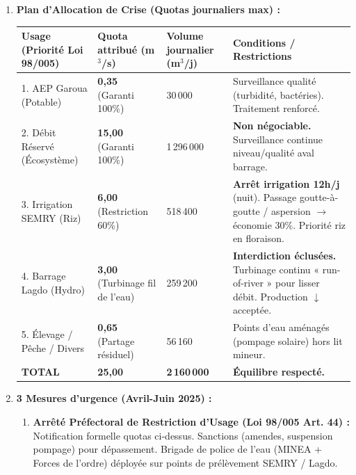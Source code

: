 \documentclass[11pt]{article}
\begin{document}
\begin{exoresolu}
\begin{enumerate}
\begin{itemize}
            \item Élevage / Pêche / Autre : Estimé $< 2$ m$^3$/s (diffus).
        \end{itemize}
        \item \textbf{Plan d'Allocation de Crise (Quotas journaliers max) :}
        \begin{center}
            \begin{tabularx}{\linewidth}{|l|l|l|X|}\hline
            \rowcolor{popblueL}
            \textbf{Usage (Priorité Loi 98/005)} & \textbf{Quota attribué (m$^3$/s)} & \textbf{Volume journalier (m$^3$/j)} & \textbf{Conditions / Restrictions} \\ \hline
            1. AEP Garoua (Potable) & \textbf{0,35} (Garanti 100\%) & 30\,000 & Surveillance qualité (turbidité, bactéries). Traitement renforcé. \\ \hline
            2. Débit Réservé (Écosystème) & \textbf{15,00} (Garanti 100\%) & 1\,296\,000 & \textbf{Non négociable.} Surveillance continue niveau/qualité aval barrage. \\ \hline
            3. Irrigation SEMRY (Riz) & \textbf{6,00} (Restriction 60\%) & 518\,400 & \textbf{Arrêt irrigation 12h/j} (nuit). Passage goutte-à-goutte / aspersion $\rightarrow$ économie 30\%. Priorité riz en floraison. \\ \hline
            4. Barrage Lagdo (Hydro) & \textbf{3,00} (Turbinage fil de l'eau) & 259\,200 & \textbf{Interdiction éclusées.} Turbinage continu « run-of-river » pour lisser débit. Production $\downarrow$ acceptée. \\ \hline
            5. Élevage / Pêche / Divers & \textbf{0,65} (Partage résiduel) & 56\,160 & Points d'eau aménagés (pompage solaire) hors lit mineur. \\ \hline
            \textbf{TOTAL} & \textbf{25,00} & \textbf{2\,160\,000} & \textbf{Équilibre respecté.} \\ \hline
        \end{tabularx}
    \end{center}
        \item \textbf{3 Mesures d'urgence (Avril-Juin 2025) :}
        \begin{enumerate}
            \item \textbf{Arrêté Préfectoral de Restriction d'Usage (Loi 98/005 Art. 44) :} Notification formelle quotas ci-dessus. Sanctions (amendes, suspension pompage) pour dépassement. Brigade de police de l'eau (MINEA + Forces de l'ordre) déployée sur points de prélèvement SEMRY / Lagdo.

\end{enumerate}
\end{enumerate}
\end{exoresolu}
\end{document}
